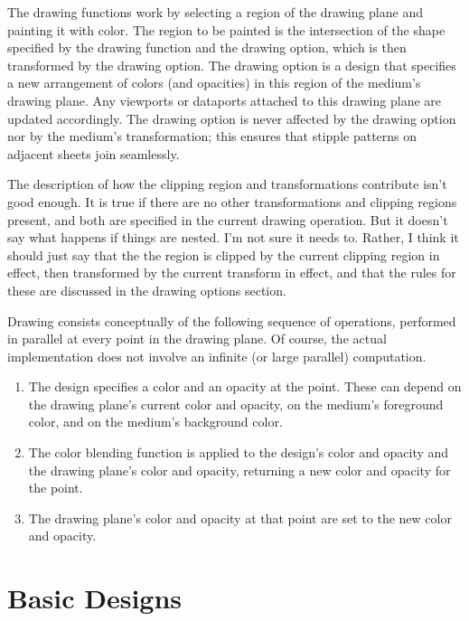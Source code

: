 The drawing functions work by selecting a region of the drawing plane and
painting it with color.  The region to be painted is the intersection of the
shape specified by the drawing function and the  drawing
option, which is then transformed by the  drawing option.
The  drawing option is a design that specifies a new arrangement of
colors (and opacities) in this region of the medium's drawing plane.  Any
viewports or dataports attached to this drawing plane are updated accordingly.
The  drawing option is never affected by the 
drawing option nor by the medium's transformation; this ensures that stipple
patterns on adjacent sheets join seamlessly.

 {The description of how the clipping region and transformations
contribute isn't good enough.  It is true if there are no other transformations
and clipping regions present, and both are specified in the current drawing
operation.  But it doesn't say what happens if things are nested.  I'm not sure
it needs to.  Rather, I think it should just say that the the region is clipped
by the current clipping region in effect, then transformed by the current
transform in effect, and that the rules for these are discussed in the drawing
options section.}

Drawing consists conceptually of the following sequence of operations, performed
in parallel at every point in the drawing plane.  Of course, the actual
implementation does not involve an infinite (or large parallel) computation.

\begin{enumerate}
\item The design specifies a color and an opacity at the point.  These can
depend on the drawing plane's current color and opacity, on the medium's
foreground color, and on the medium's background color.

\item The color blending function is applied to the design's color and opacity
and the drawing plane's color and opacity, returning a new color and opacity for
the point.

\item The drawing plane's color and opacity at that point are set to the new
color and opacity.
\end{enumerate}

\section {Basic Designs}

